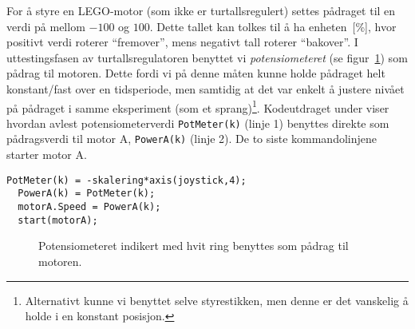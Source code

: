 For å styre en LEGO-motor (som ikke er turtallsregulert) 
settes pådraget til
en verdi på mellom $-100$ og $100$. Dette tallet kan tolkes til å ha
enheten~[\%], hvor positivt verdi roterer ``fremover'', mens negativt tall roterer
``bakover''.
I uttestingsfasen av turtallsregulatoren
benyttet vi {\em potensiometeret}
(se figur~\ref{fig:potmeter})
\reversemarginpar{}
som pådrag til motoren.
Dette fordi vi på denne måten
kunne holde pådraget helt konstant/fast over en tidsperiode, men
samtidig at det var enkelt å justere nivået på pådraget i
samme eksperiment (som et sprang)\footnote{Alternativt kunne
vi benyttet selve styrestikken, men denne er det 
vanskelig å holde i en konstant posisjon. }. 
Kodeutdraget under viser hvordan
avlest potensiometerverdi
\reversemarginpar{}
{\tt  PotMeter(k)} (linje 1) benyttes direkte som 
pådragsverdi til motor A, {\tt PowerA(k)} (linje 2). De to siste
kommandolinjene starter motor A.
\normalmarginpar{}
\begin{lstlisting}[caption=Kode for å bestemme
og sette pådraget til motor A
  (Mac-versjon), 
  label=kode:padrag]
  PotMeter(k) = -skalering*axis(joystick,4);
  PowerA(k) = PotMeter(k);
  motorA.Speed = PowerA(k);
  start(motorA);   
\end{lstlisting}

\begin{figure}[ht] %
  \centering
  \caption{Potensiometeret indikert med hvit ring benyttes som pådrag til
    motoren.} 
  \label{fig:potmeter}
\end{figure}

